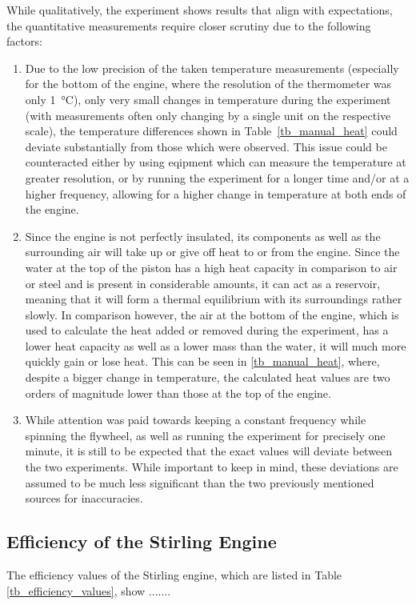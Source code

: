 \documentclass[titlepage]{article}
\begin{document}
While qualitatively, the experiment shows results that align with expectations, the quantitative measurements require closer scrutiny due to the following factors:
%
\begin{enumerate}
    \item Due to the low precision of the taken temperature measurements (especially for the bottom of the engine, where the resolution of the thermometer was only 1~°C), only very small changes in temperature during the experiment (with measurements often only changing by a single unit on the respective scale), the temperature differences shown in Table~\ref{tb_manual_heat} could deviate substantially from those which were observed. This issue could be counteracted either by using eqipment which can measure the temperature at greater resolution, or by running the experiment for a longer time and/or at a higher frequency, allowing for a higher change in temperature at both ends of the engine.
    \item Since the engine is not perfectly insulated, its components as well as the surrounding air will take up or give off heat to or from the engine. Since the water at the top of the piston has a high heat capacity in comparison to air or steel and is present in considerable amounts, it can act as a reservoir, meaning that it will form a thermal equilibrium with its surroundings rather slowly. In comparison however, the air at the bottom of the engine, which is used to calculate the heat added or removed during the experiment, has a lower heat capacity as well as a lower mass than the water, it will much more quickly gain or lose heat. This can be seen in \ref{tb_manual_heat}, where, despite a bigger change in temperature, the calculated heat values are two orders of magnitude lower than those at the top of the engine.
    \item While attention was paid towards keeping a constant frequency while spinning the flywheel, as well as running the experiment for precisely one minute, it is still to be expected that the exact values will deviate between the two experiments. While important to keep in mind, these deviations are assumed to be much less significant than the two previously mentioned sources for inaccuracies.
\end{enumerate}

\subsection{Efficiency of the Stirling Engine}
The efficiency values of the Stirling engine, which are listed in Table \ref{tb_efficiency_values}, show .......
\end{document}
